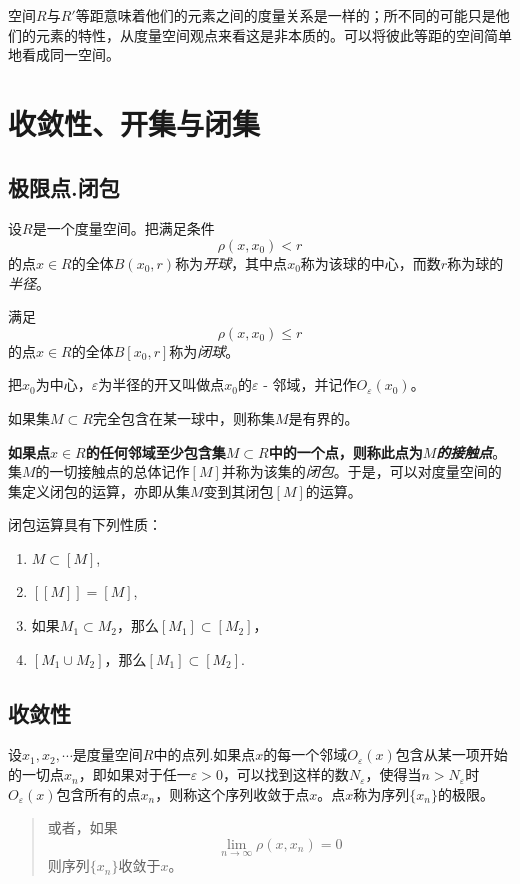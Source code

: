 空间$R$与$R'$等距意味着他们的元素之间的度量关系是一样的；所不同的可能只是他们的元素的特性，从度量空间观点来看这是非本质的。可以将彼此等距的空间简单地看成同一空间。
\section{收敛性、开集与闭集}
\subsection{极限点.闭包}
设$R$是一个度量空间。把满足条件
\begin{equation*}
\rho(x,x_0)<r
\end{equation*}
的点$x \in R$的全体$B(x_0,r)$称为\emph{\textcolor[rgb]{1,0,0}{开球}}，其中点$x_0$称为该球的中心，而数$r$称为球的\emph{\textcolor[rgb]{1,0,0}{半径}}。

满足
\[
\rho(x,x_0) \leqslant r
\]
的点$x \in R$的全体$B[x_0,r]$称为\emph{\textcolor[rgb]{1,0,0}{闭球}}。

把$x_0$为中心，$\varepsilon$为半径的开又叫做点$x_0$的$\varepsilon$ - 邻域，并记作$O_{\varepsilon}(x_0)$。

如果集$M \subset R$完全包含在某一球中，则称集$M$是有界的。

\textbf{如果点$x \in R$的任何邻域至少包含集$M \subset R$中的一个点，则称此点为\emph{\textcolor[rgb]{1,0,0}{$M$的接触点}}}。集$M$的一切接触点的总体记作$[M]$并称为该集的\emph{\textcolor[rgb]{1,0,0}{闭包}}。于是，可以对度量空间的集定义闭包的运算，亦即从集$M$变到其闭包$[M]$的运算。
\begin{theorem}
	\label{th2.2.1}
	闭包运算具有下列性质：
	\begin{enumerate}[1)]
		\item $M \subset [M]$,
		\item $[[M]]=[M]$,
		\item 如果$M_1 \subset M_2$，那么$[M_1] \subset [M_2]$，
		\item $[M_1 \cup M_2]$，那么$[M_1] \subset [M_2]$.
	\end{enumerate}
\end{theorem}

\subsection{收敛性}
设$x_1,x_2,\cdots$是度量空间$R$中的点列.如果点$x$的每一个邻域$O_{\varepsilon}(x)$包含从某一项开始的一切点$x_n$，即如果对于任一$\varepsilon>0$，可以找到这样的数$N_{\varepsilon}$，使得当$n>N_{\varepsilon}$时$O_{\varepsilon}(x)$包含所有的点$x_n$，则称这个序列收敛于点$x$。点$x$称为序列$\{x_n\}$的极限。
\begin{quote}
	或者，如果
	\[
	\lim\limits_{n\rightarrow\infty}\rho(x,x_n)=0
	\]
	则序列$\{x_n\}$收敛于$x$。
\end{quote}

